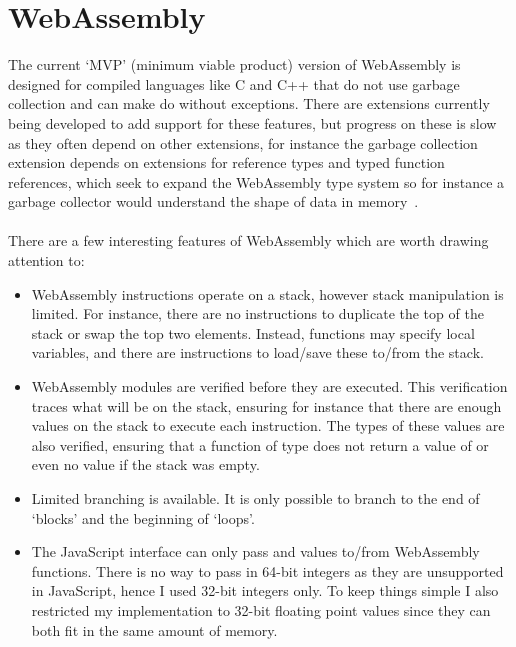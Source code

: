 
\section{WebAssembly}
The current `MVP' (minimum viable product) version of WebAssembly is designed for compiled languages like C and C++ that do not use garbage collection and can make do without exceptions. There are extensions currently being developed to add support for these features, but progress on these is slow as they often depend on other extensions, for instance the garbage collection extension depends on extensions for reference types and typed function references, which seek to expand the WebAssembly type system so for instance a garbage collector would understand the shape of data in memory~\cite{Wgce}.
\\\\
There are a few interesting features of WebAssembly which are worth drawing attention to:
\begin{itemize}
    \item WebAssembly instructions operate on a stack, however stack manipulation is limited. For instance, there are no instructions to duplicate the top of the stack or swap the top two elements. Instead, functions may specify local variables, and there are instructions to load/save these to/from the stack.
    \item WebAssembly modules are verified before they are executed. This verification traces what will be on the stack, ensuring for instance that there are enough values on the stack to execute each instruction. The types of these values are also verified, ensuring that a function of type  does not return a value of  or even no value if the stack was empty.
    \item Limited branching is available. It is only possible to branch to the end of `blocks' and the beginning of `loops'.
    \item The JavaScript interface can only pass  and  values to/from WebAssembly functions. There is no way to pass in 64-bit integers as they are unsupported in JavaScript, hence I used 32-bit integers only. To keep things simple I also restricted my implementation to 32-bit floating point values since they can both fit in the same amount of memory.
\end{itemize}

